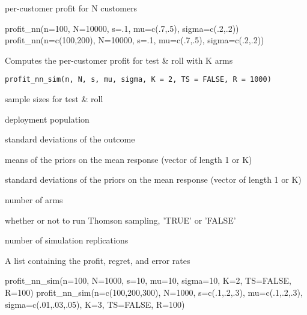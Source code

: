 \documentclass[a4paper]{book}
\begin{document}
%
\begin{Value}
per-customer profit for N customers
\end{Value}
%
\begin{Examples}
\begin{ExampleCode}
profit_nn(n=100, N=10000, s=.1, mu=c(.7,.5), sigma=c(.2,.2))
profit_nn(n=c(100,200), N=10000, s=.1, mu=c(.7,.5), sigma=c(.2,.2))
\end{ExampleCode}
\end{Examples}
%
\begin{Description}\relax
Computes the per-customer profit for test \& roll with K arms
\end{Description}
%
\begin{Usage}
\begin{verbatim}
profit_nn_sim(n, N, s, mu, sigma, K = 2, TS = FALSE, R = 1000)
\end{verbatim}
\end{Usage}
%
\begin{Arguments}
\begin{ldescription}
\item[\code{n}] sample sizes for test \& roll

\item[\code{N}] deployment population

\item[\code{s}] standard deviations of the outcome

\item[\code{mu}] means of the priors on the mean response (vector of length 1 or K)

\item[\code{sigma}] standard deviations of the priors on the mean response (vector of length 1 or K)

\item[\code{K}] number of arms

\item[\code{TS}] whether or not to run Thomson sampling, 'TRUE' or 'FALSE'

\item[\code{R}] number of simulation replications
\end{ldescription}
\end{Arguments}
%
\begin{Value}
A list containing the profit, regret, and error rates
\end{Value}
%
\begin{Examples}
\begin{ExampleCode}
profit_nn_sim(n=100, N=1000, s=10, mu=10, sigma=10, K=2, TS=FALSE, R=100)
profit_nn_sim(n=c(100,200,300), N=1000, s=c(.1,.2,.3), mu=c(.1,.2,.3), sigma=c(.01,.03,.05), K=3, TS=FALSE, R=100)

\end{ExampleCode}
\end{Examples}
\end{document}
